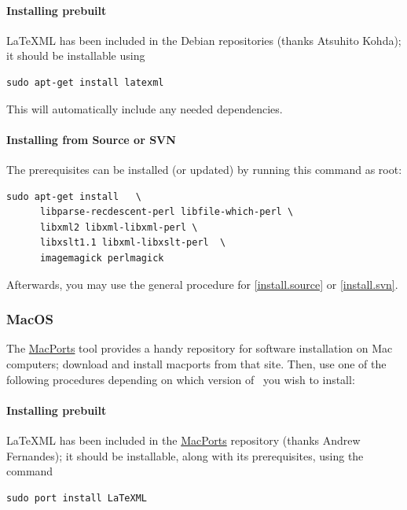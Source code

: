 \documentclass{article}
\begin{document}
\paragraph{Installing prebuilt}
LaTeXML has been included in the Debian repositories (thanks Atsuhito Kohda);
it should be installable using
\begin{lstlisting}[style=shell]
  sudo apt-get install latexml
\end{lstlisting}
This will automatically include any needed dependencies.

\paragraph{Installing from Source or SVN}
The prerequisites can be installed (or updated) by running this command as root: 
\begin{lstlisting}[style=shell]
   sudo apt-get install   \
      libparse-recdescent-perl libfile-which-perl \
      libxml2 libxml-libxml-perl \
      libxslt1.1 libxml-libxslt-perl  \
      imagemagick perlmagick
\end{lstlisting}
Afterwards, you may use the general procedure for
\ref{install.source} or \ref{install.svn}.


\subsubsection{MacOS}\label{install.macos}
The \href{http://www.macports.org}{MacPorts} tool provides a handy
repository for software installation on Mac computers;
download and install macports from that site.
Then, use one of the following procedures depending on which version
of \LaTeXML\ you wish to install:

\paragraph{Installing prebuilt}
LaTeXML has been included in the \href{http://www.macports.org}{MacPorts}
repository (thanks Andrew Fernandes);
it should be installable, along with its prerequisites, using the command
\begin{lstlisting}[style=shell]
  sudo port install LaTeXML
\end{lstlisting}

\end{document}
